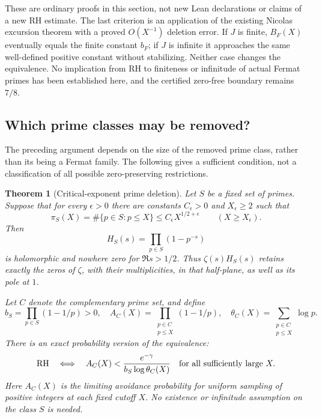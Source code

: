 \documentclass[11pt]{article}
\newtheorem{theorem}{Theorem}[section]
\theoremstyle{definition}
\begin{document}
These are ordinary proofs in this section, not new Lean
declarations or claims of a new RH estimate. The last criterion
is an application of the existing Nicolas excursion theorem
with a proved $O(X^{-1})$ deletion error. If $J$ is finite,
$B_F(X)$ eventually equals the finite constant $b_F$; if $J$
is infinite it approaches the same well-defined positive
constant without stabilizing. Neither case changes the
equivalence. No implication from RH to finiteness or infinitude
of actual Fermat primes has been established here, and the
certified zero-free boundary remains $7/8$.

\subsection{Which prime classes may be removed?}
\label{sec:prime-class-deletion}

The preceding argument depends on the size of the removed prime
class, rather than its being a Fermat family. The following gives
a sufficient condition, not a classification of all possible
zero-preserving restrictions.

\begin{theorem}[Critical-exponent prime deletion]
\label{thm:critical-prime-deletion}
Let $S$ be a fixed set of primes. Suppose that for every
$\epsilon>0$ there are constants $C_\epsilon>0$ and
$X_\epsilon\ge2$ such that
\[
 \pi_S(X)=\#\{p\in S:p\le X\}
 \le C_\epsilon X^{1/2+\epsilon}
 \qquad(X\ge X_\epsilon).
\]
Then
\[
 H_S(s)=\prod_{p\in S}(1-p^{-s})
\]
is holomorphic and nowhere zero for $\Re s>1/2$.
Thus $\zeta(s)H_S(s)$ retains exactly the zeros of $\zeta$,
with their multiplicities, in that half-plane, as well as its
pole at $1$.

Let $C$ denote the complementary prime set, and define
\[
 b_S=\prod_{p\in S}(1-1/p)>0,\quad
 A_C(X)=\prod_{\substack{p\in C\\p\le X}}(1-1/p),\quad
 \theta_C(X)=\sum_{\substack{p\in C\\p\le X}}\log p.
\]
There is an exact probability version of the equivalence:
\[
 \mathrm{RH}\quad\Longleftrightarrow\quad
 A_C(X)<\frac{e^{-\gamma}}{b_S\log\theta_C(X)}
 \quad\hbox{for all sufficiently large }X.
\]
Here $A_C(X)$ is the limiting avoidance probability for
uniform sampling of positive integers at each fixed cutoff $X$.
No existence or infinitude assumption on the class $S$ is needed.
\end{theorem}
\end{document}
